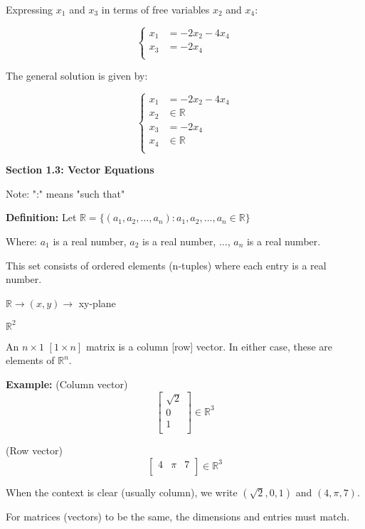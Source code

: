 \documentclass{article}
\begin{document}
Expressing \(x_1\) and \(x_3\) in terms of free variables \(x_2\) and \(x_4\):

\[
\begin{cases}
    x_1 &= -2x_2 - 4x_4 \\
    x_3 &= -2x_4 \\
\end{cases}
\]

The general solution is given by:

\[
\begin{cases}
    x_1 &= -2x_2 - 4x_4  \\
    x_2 &\in \mathbb{R} \\
    x_3 &= -2x_4 \\
    x_4 &\in \mathbb{R} \\
\end{cases}
\]

\textbf{Section 1.3: Vector Equations}

Note: ":" means "such that"

\textbf{Definition:} Let \(\mathbb{R} = \{(a_1, a_2, \ldots, a_n) : a_1, a_2, \ldots, a_n \in \mathbb{R}\}\)

Where:
\(a_1\) is a real number,
\(a_2\) is a real number,
\(\ldots\),
\(a_n\) is a real number.

This set consists of ordered elements (n-tuples) where each entry is a real number.

\(\mathbb{R} \to (x, y) \to\) xy-plane

\(\mathbb{R}^2\)

An \(n \times 1\) \([1 \times n]\) matrix is a column [row] vector. In either case, these are elements of \(\mathbb{R}^n\).

\textbf{Example:}
(Column vector)
\[
\begin{bmatrix}
    \sqrt{2} \\
    0 \\
    1 \\
\end{bmatrix}
\in \mathbb{R}^3
\]

(Row vector)
\[
\begin{bmatrix}
    4 & \pi & 7 \\
\end{bmatrix}
\in \mathbb{R}^3
\]

When the context is clear (usually column), we write \((\sqrt{2}, 0, 1)\) and \((4, \pi, 7)\).

For matrices (vectors) to be the same, the dimensions and entries must match.
\end{document}
